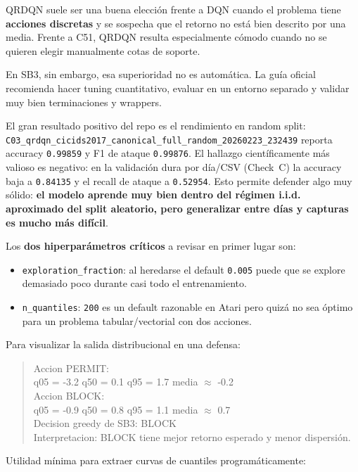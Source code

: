﻿\documentclass[12pt,a4paper]{article}
\begin{document}
QRDQN suele ser una buena elección frente a DQN cuando el problema tiene \textbf{acciones
discretas} y se sospecha que el retorno no está bien descrito por una media. Frente a C51, QRDQN
resulta especialmente cómodo cuando no se quieren elegir manualmente cotas de soporte.

En SB3, sin embargo, esa superioridad no es automática. La guía oficial recomienda hacer tuning
cuantitativo, evaluar en un entorno separado y validar muy bien terminaciones y wrappers.

El gran resultado positivo del repo es el rendimiento en random split:
\texttt{C03\_qrdqn\_cicids2017\_canonical\_full\_random\_20260223\_232439} reporta accuracy
\texttt{0.99859} y F1 de ataque \texttt{0.99876}. El hallazgo científicamente más valioso es
negativo: en la validación dura por día/CSV (Check~C) la accuracy baja a \texttt{0.84135} y el
recall de ataque a \texttt{0.52954}. Esto permite defender algo muy sólido: \textbf{el modelo
aprende muy bien dentro del régimen i.i.d. aproximado del split aleatorio, pero generalizar entre
días y capturas es mucho más difícil}.

Los \textbf{dos hiperparámetros críticos} a revisar en primer lugar son:
\begin{itemize}
  \item \texttt{exploration\_fraction}: al heredarse el default \texttt{0.005} puede que se explore
        demasiado poco durante casi todo el entrenamiento.
  \item \texttt{n\_quantiles}: \texttt{200} es un default razonable en Atari pero quizá no sea
        óptimo para un problema tabular/vectorial con dos acciones.
\end{itemize}

Para visualizar la salida distribucional en una defensa:

\begin{quote}\ttfamily
Accion PERMIT:\\
q05 = -3.2    q50 = 0.1    q95 = 1.7    media $\approx$ -0.2\\

Accion BLOCK:\\
q05 = -0.9    q50 = 0.8    q95 = 1.1    media $\approx$  0.7\\

Decision greedy de SB3: BLOCK\\
Interpretacion: BLOCK tiene mejor retorno esperado y menor dispersión.
\end{quote}

Utilidad mínima para extraer curvas de cuantiles programáticamente:
\end{document}
